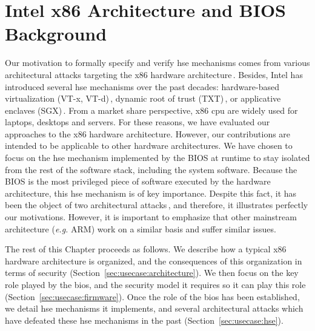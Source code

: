 \chapter{Intel x86 Architecture and BIOS Background}
\label{chapter:usecase}


\vspace{1cm}\noindent
%
Our motivation to formally specify and verify \ac{hse} mechanisms comes from
various architectural attacks targeting the x86 hardware
architecture\,\cite{duflot2009smram,wojtczuk2009smram,kallenberg2015racecondition,domas2015sinkhole,kovah2015senter}.
%
Besides, Intel has introduced several \ac{hse} mechanisms over the past decades:
hardware-based virtualization (VT-x, VT-d)\,\cite{intel2014manualvt}, dynamic
root of trust (TXT)\,\cite{intel2015txt}, or applicative enclaves
(SGX)\,\cite{intel2014manualsgx,costan2016sgxexplained}.
%
From a market share perspective, x86 \ac{cpu} are widely used for laptops,
desktops and servers.
%
For these reasons, we have evaluated our approaches to the x86 hardware
architecture.
%
However, our contributions are intended to be applicable to other hardware
architectures.
%
We have chosen to focus on the \ac{hse} mechanism implemented by the BIOS at
runtime to stay isolated from the rest of the software stack, including the
system software.
%
Because the BIOS is the most privileged piece of software executed by the
hardware architecture, this \ac{hse} mechanism is of key importance.
%
Despite this fact, it has been the object of two architectural 
attacks\,\cite{duflot2009smram,wojtczuk2009smram,domas2015sinkhole}, and
therefore, it illustrates perfectly our motivations.
%
However, it is important to emphasize that other mainstream architecture
(\emph{e.g.}  ARM) work on a similar basis and suffer similar issues.

The rest of this Chapter proceeds as follows.
%
We describe how a typical x86 hardware architecture is organized, and the
consequences of this organization in terms of security
(Section~\ref{sec:usecase:architecture}).
%
We then focus on the key role played by the \ac{bios}, and the security model it
requires so it can play this role (Section~\ref{sec:usecase:firmware}).
%
Once the role of the \ac{bios} has been established, we detail \ac{hse}
mechanisms it implements, and several architectural attacks which have defeated
these \ac{hse} mechanisms in the past (Section~\ref{sec:usecase:hse}).

